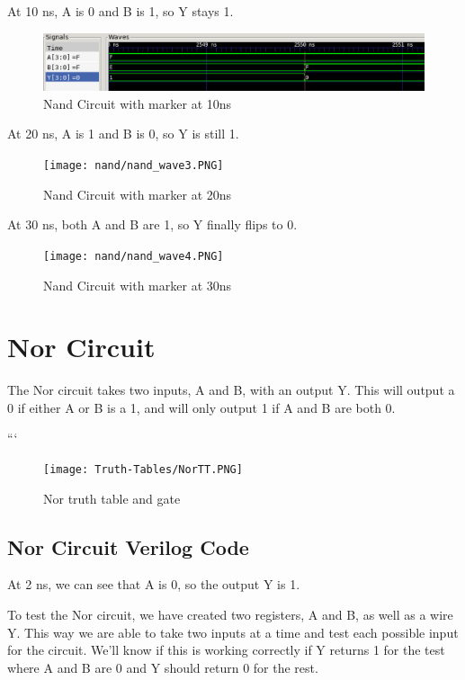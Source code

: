 \documentclass[12pt]{article}
\begin{document}
At 10 ns, A is 0 and B is 1, so Y stays 1.
\begin{figure}[H]
    \centering
    \includegraphics[width = 1.0\textwidth]{nand/nand_wave2.PNG}
    \caption{Nand Circuit with marker at 10ns}
    \label{fig:enter-label}
\end{figure}

At 20 ns, A is 1 and B is 0, so Y is still 1.
\begin{figure}[H]
    \centering
    \texttt{[image: nand/nand\_wave3.PNG]}
    \caption{Nand Circuit with marker at 20ns}
    \label{fig:enter-label}
\end{figure}

At 30 ns, both A and B are 1, so Y finally flips to 0.
\begin{figure}[H]
    \centering
    \texttt{[image: nand/nand\_wave4.PNG]}
    \caption{Nand Circuit with marker at 30ns}
    \label{fig:enter-label}
\end{figure}

\section{Nor Circuit}
The Nor circuit takes two inputs, A and B, with an output Y. This will output a 0 if either A or B is a 1, and will only output 1 if A and B are both 0.

```\begin{figure}[H]
    \centering
    \texttt{[image: Truth-Tables/NorTT.PNG]}
    \caption{Nor truth table and gate}
    \label{fig:shift-table}
\end{figure}

\subsection{Nor Circuit Verilog Code}
At 2 ns, we can see that  A is 0, so the output Y is 1.


To test the Nor circuit, we have created two registers, A and B, as well as a wire Y. This way we are able to take two inputs at a time and test each possible input for the circuit. We'll know if this is working correctly if Y returns 1 for the test where A and B are 0 and Y should return 0 for the rest.

\end{document}
